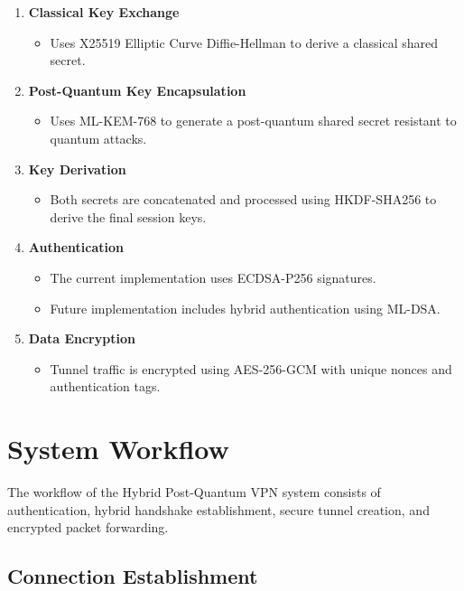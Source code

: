 \begin{enumerate}
    \item \textbf{Classical Key Exchange}
    \begin{itemize}
        \item Uses X25519 Elliptic Curve Diffie-Hellman to derive a classical shared secret.
    \end{itemize}

    \item \textbf{Post-Quantum Key Encapsulation}
    \begin{itemize}
        \item Uses ML-KEM-768 to generate a post-quantum shared secret resistant to quantum attacks.
    \end{itemize}

    \item \textbf{Key Derivation}
    \begin{itemize}
        \item Both secrets are concatenated and processed using HKDF-SHA256 to derive the final session keys.
    \end{itemize}

    \item \textbf{Authentication}
    \begin{itemize}
        \item The current implementation uses ECDSA-P256 signatures.
        \item Future implementation includes hybrid authentication using ML-DSA.
    \end{itemize}

    \item \textbf{Data Encryption}
    \begin{itemize}
        \item Tunnel traffic is encrypted using AES-256-GCM with unique nonces and authentication tags.
    \end{itemize}
\end{enumerate}

\section{System Workflow}

The workflow of the Hybrid Post-Quantum VPN system consists of authentication, hybrid handshake establishment, secure tunnel creation, and encrypted packet forwarding.



\subsection{Connection Establishment}


